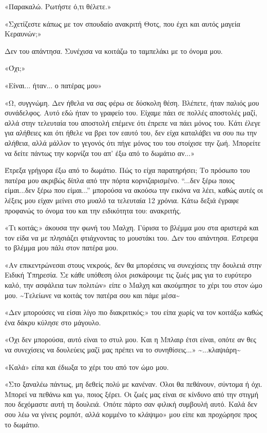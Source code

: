 \documentclass[12pt,twoside, openany]{book}
\begin{document}
«Παρακαλώ. Ρωτήστε ό,τι θέλετε.»

«Σχετίζεστε κάπως με τον σπουδαίο ανακριτή Θοτς, που έχει και αυτός μαγεία Κεραυνών;»

Δεν του απάντησα. Συνέχισα να κοιτάζω το ταμπελάκι με το όνομα μου.

«Όχι;»

«Είναι... ήταν... ο πατέρας μου»

«Ω, συγγνώμη. Δεν ήθελα να σας φέρω σε δύσκολη θέση. Βλέπετε, ήταν παλιός μου συνάδελφος. Αυτό εδώ ήταν το γραφείο του. Είχαμε πάει σε πολλές αποστολές μαζί, αλλά στην τελευταία του αποστολή επέμενε ότι έπρεπε να πάει μόνος του. Κάτι έλεγε για αλήθειες και ότι ήθελε να βρει τον εαυτό του, δεν είχα καταλάβει να σου πω την αλήθεια, αλλά μάλλον το γεγονός ότι πήγε μόνος του του στοίχισε την ζωή. Μπορείτε να δείτε πάντως την κορνίζα του απ’ έξω από το δωμάτιο αν...»

Έτρεξα γρήγορα έξω από το δωμάτιο. Πώς το είχα παρατηρήσει; Το πρόσωπο του πατέρα μου ακριβώς δίπλα από την πόρτα κορνιζαρισμένο. “...δεν ξέρω ποιος είμαι...δεν ξέρω που είμαι...” μπορούσα να ακούσω την εικόνα να λέει, καθώς αυτές οι λέξεις μου είχαν μείνει στο μυαλό τα τελευταία 12 χρόνια. Κάτω δεξιά έγραφε προφανώς το όνομα του και την ειδικότητα του: ανακριτής.

«Τι κοιτάς;» άκουσα την φωνή του Μαλχη. Γύρισα το βλέμμα μου στα αριστερά και τον είδα να με πλησιάζει φτιάχνοντας το μουστάκι του. Δεν του απάντησα. Έστρεψα το βλέμμα μου πάλι στον πατέρα μου.

«Αν επικεντρώνεσαι στους νεκρούς, δεν θα μπορέσεις να συνεχίσεις την δουλειά στην Ειδική Υπηρεσία. Σε κάθε υπόθεση όλοι ρισκάρουμε τις ζωές μας για το ευρύτερο καλό, την ασφάλεια των πολιτών» είπε ο Μαλχη και ακούμπησε το χέρι του στον ώμο μου. \textasciitilde Τελείωνε να κοιτάς τον πατέρα σου και πάμε μέσα\textasciitilde 

«Δεν μπορούσες να είσαι λίγο πιο διακριτικός;» του είπα χωρίς να τον κοιτάξω καθώς ένα δάκρυ κύλησε στο μάγουλο.

«Όχι δεν μπορούσα, αυτό είναι το στυλ μου. Και η Μπλαιρ έτσι είναι, οπότε αν θες να συνεχίσεις να δουλεύεις μαζί μας πρέπει να το συνηθίσεις...» \textasciitilde ...κλαψιάρη\textasciitilde 

«Καλά» είπα και έδιωξα το χέρι του από τον ώμο μου.

«Στο ξαναλέω πάντως, μη δεθείς πολύ με κανέναν. Όλοι θα πεθάνουν, σύντομα ή όχι. Μπορεί να πεθάνω και γω, ποιος ξέρει. Οι ζωές μας είναι σε κίνδυνο από την στιγμή που δεχόμαστε αυτή τη δουλειά. Οπότε πάρτο σαν φιλική συμβουλή αυτό. Καλά δεν σου λέω να γίνεις ρομπότ, αλλά κομμένο το κλάψιμο» μου είπε και προχώρησε προς το δωμάτιο.
\end{document}
